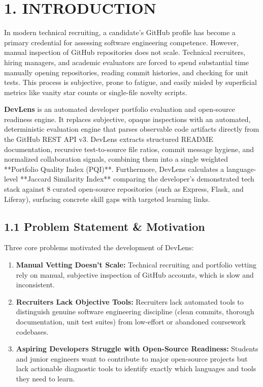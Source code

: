 \documentclass[12pt,a4paper]{article}
\begin{document}
\newpage
\thispagestyle{fancy}
\section{1. INTRODUCTION}

In modern technical recruiting, a candidate's GitHub profile has become a primary credential for assessing software engineering competence. However, manual inspection of GitHub repositories does not scale. Technical recruiters, hiring managers, and academic evaluators are forced to spend substantial time manually opening repositories, reading commit histories, and checking for unit tests. This process is subjective, prone to fatigue, and easily misled by superficial metrics like vanity star counts or single-file novelty scripts.

\textbf{DevLens} is an automated developer portfolio evaluation and open-source readiness engine. It replaces subjective, opaque inspections with an automated, deterministic evaluation engine that parses observable code artifacts directly from the GitHub REST API v3. DevLens extracts structured README documentation, recursive test-to-source file ratios, commit message hygiene, and normalized collaboration signals, combining them into a single weighted **Portfolio Quality Index (PQI)**. Furthermore, DevLens calculates a language-level **Jaccard Similarity Index** comparing the developer's demonstrated tech stack against 8 curated open-source repositories (such as Express, Flask, and Liferay), surfacing concrete skill gaps with targeted learning links.

\subsection{1.1 Problem Statement \& Motivation}
Three core problems motivated the development of DevLens:
\begin{enumerate}
    \item \textbf{Manual Vetting Doesn't Scale:} Technical recruiting and portfolio vetting rely on manual, subjective inspection of GitHub accounts, which is slow and inconsistent.
    \item \textbf{Recruiters Lack Objective Tools:} Recruiters lack automated tools to distinguish genuine software engineering discipline (clean commits, thorough documentation, unit test suites) from low-effort or abandoned coursework codebases.
    \item \textbf{Aspiring Developers Struggle with Open-Source Readiness:} Students and junior engineers want to contribute to major open-source projects but lack actionable diagnostic tools to identify exactly which languages and tools they need to learn.
\end{enumerate}
\end{document}
